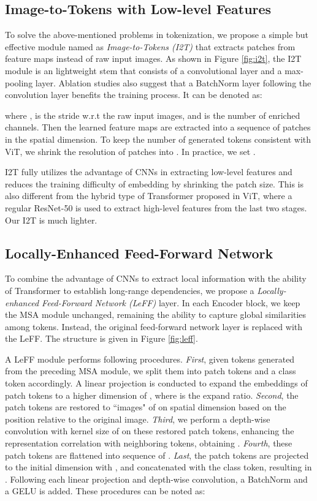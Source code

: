 \documentclass[10pt,twocolumn,letterpaper]{article}
\begin{document}
\subsection{Image-to-Tokens with Low-level Features}\label{sec:i2t}

To solve the above-mentioned problems in tokenization, we propose a simple but effective module named as \textit{Image-to-Tokens (I2T)} that extracts patches from feature maps instead of raw input images. As shown in Figure \ref{fig:i2t}, the I2T module is an lightweight stem that consists of a convolutional layer and a max-pooling layer. Ablation studies also suggest that a BatchNorm layer following the convolution layer benefits the training process. It can be denoted as:

where ,  is the stride w.r.t the raw input images, and  is the number of enriched channels. Then the learned feature maps are extracted into a sequence of patches in the spatial dimension. To keep the number of generated tokens consistent with ViT, we shrink the resolution of patches into . In practice, we set .

I2T fully utilizes the advantage of CNNs in extracting low-level features and reduces the training difficulty of embedding by shrinking the patch size. This is also different from the hybrid type of Transformer proposed in ViT, where a regular ResNet-50 is used to extract high-level features from the last two stages. Our I2T is much lighter.





\subsection{Locally-Enhanced Feed-Forward Network}\label{sec:leff}

To combine the advantage of CNNs to extract local information with the ability of Transformer to establish long-range dependencies, we propose a \textit{Locally-enhanced Feed-Forward Network (LeFF)} layer. In each Encoder block, we keep the MSA module unchanged, remaining the ability to capture global similarities among tokens. Instead, the original feed-forward network layer is replaced with the LeFF. The structure is given in Figure \ref{fig:leff}.

A LeFF module performs following procedures. \textit{First}, given tokens  generated from the preceding MSA module, we split them into patch tokens  and a class token  accordingly. A linear projection is conducted to expand the embeddings of patch tokens to a higher dimension of , where  is the expand ratio. \textit{Second}, the patch tokens are restored to ``images" of  on spatial dimension based on the position relative to the original image. \textit{Third}, we perform a depth-wise convolution with kernel size of  on these restored patch tokens, enhancing the representation correlation with neighboring  tokens, obtaining . \textit{Fourth}, these patch tokens are flattened into sequence of . \textit{Last}, the patch tokens are projected to the initial dimension with , and concatenated with the class token, resulting in . Following each linear projection and depth-wise convolution, a BatchNorm and a GELU is added. These procedures can be noted as:
\end{document}
